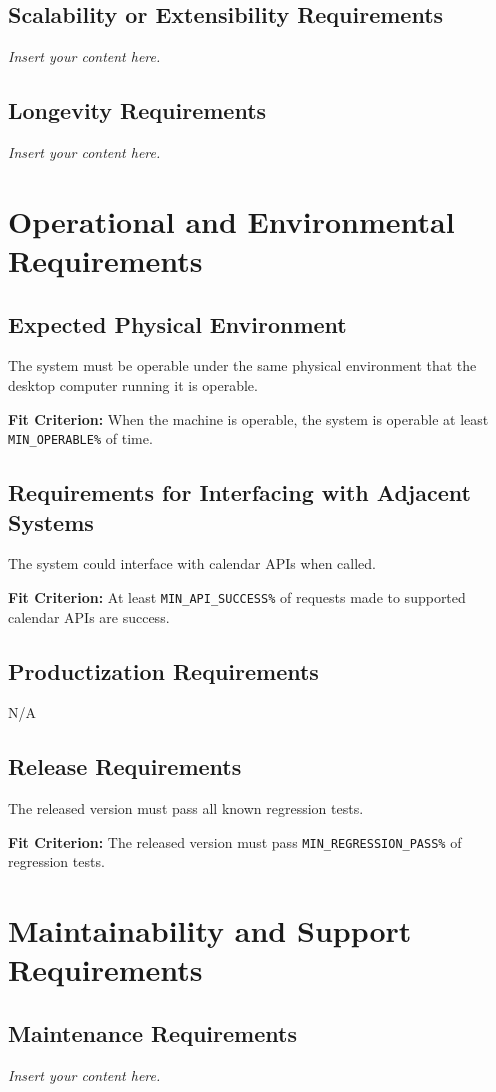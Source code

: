 \documentclass[12pt]{article}
\newcommand{\lips}{\textit{Insert your content here.}}
\begin{document}
\subsection{Scalability or Extensibility Requirements}
\lips
\subsection{Longevity Requirements}
\lips

\section{Operational and Environmental Requirements}
\subsection{Expected Physical Environment}
The system must be operable under the same physical environment that the desktop computer running it is operable.

\textbf{Fit Criterion:} When the machine is operable, the system is operable at least \texttt{MIN\_OPERABLE\%} of time.

\subsection{Requirements for Interfacing with Adjacent Systems}
The system could interface with calendar APIs when called.

\textbf{Fit Criterion:} At least \texttt{MIN\_API\_SUCCESS\%} of requests made to supported calendar APIs are success.
\subsection{Productization Requirements}
N/A
\subsection{Release Requirements}
The released version must pass all known regression tests.

\textbf{Fit Criterion:} The released version must pass \texttt{MIN\_REGRESSION\_PASS\%} of regression tests. 

\section{Maintainability and Support Requirements}
\subsection{Maintenance Requirements}
\lips
\end{document}
